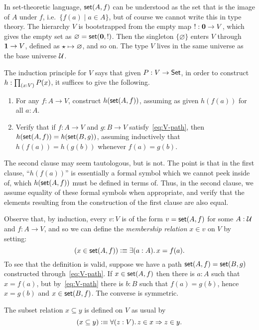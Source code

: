 In set-theoretic language, $\mathsf{set}(A,f)$ can be understood as the set that is the image of $A$ under $f$, i.e.\ $\{ f(a) \mid a
\in A \}$, but of course we cannot write this in type theory. The hierarchy $V$ is
bootstrapped from the empty map $! : \mathbf{0} \to V$, which gives the empty set as $\varnothing = \mathsf{set}(\mathbf{0},!)$.
Then the singleton $\{\varnothing\}$ enters $V$ through $\mathbf{1} \to V$, defined as $\star \mapsto \varnothing$, and so
on. The type $V$ lives in the same universe as the base universe $\mathcal{U}$.

The induction principle for $V$ says that given $P:V\to \mathsf{Set}$, in order to construct $h:\prd{x:V} P(x)$, it suffices to give the following.
\begin{enumerate}
\item For any $f:A\to V$, construct $h(\mathsf{set}(A,f))$, assuming as given $h(f(a))$ for all $a:A$.
\item Verify that if $f : A \to V$ and $g : B \to V$ satisfy~\eqref{eq:V-path}, then $h(\mathsf{set}(A,f)) = h(\mathsf{set}(B,g))$, assuming inductively that $h(f(a)) = h(g(b))$ whenever $f(a)=g(b)$.
\end{enumerate}
The second clause may seem tautologous, but is not.
The point is that in the first clause, ``$h(f(a))$'' is essentially a formal symbol which we cannot peek inside of, which $h(\mathsf{set}(A,f))$ must be defined in terms of. Thus, in the second clause, we assume equality of these formal symbols when appropriate, and verify that the elements resulting from the construction of the first clause are also equal.

Observe that, by induction, every $v:V$ is of the form $v=\mathsf{set}(A,f)$ for some $A:\mathcal{U}$ and $f:A\to V$, and so we can define the \emph{membership relation} $x\in v$ on $V$ by setting:
%
%
\begin{equation*}
  (x \in \vset(A,f)) \defeq \exis{a : A} x = f(a).
\end{equation*}
%
To see that the definition is valid, suppose we have a path $\mathsf{set}(A, f) = \mathsf{set}(B, g)$
constructed through~\eqref{eq:V-path}. If $x \in \mathsf{set}(A,f)$ then there is $a : A$ such
that $x = f(a)$, but by~\eqref{eq:V-path} there is $b : B$ such that $f(a) = g(b)$, hence
$x = g(b)$ and $x \in \mathsf{set}(B,f)$. The converse is symmetric.

The subset relation $x\subseteq y$ is defined on $V$ as usual by
%
\begin{equation*}
  (x \subseteq y) \defeq \fall{z : V} z \in x \Rightarrow z \in y.
\end{equation*}


